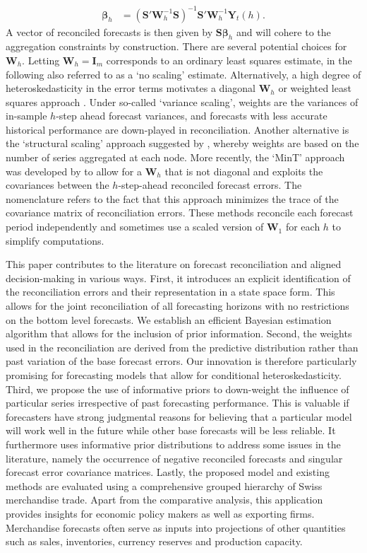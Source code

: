 \documentclass[a4paper,fleqn,11pt]{article}
\begin{document}
\begin{align}
\label{eq:reg}
\boldsymbol{\beta}_{h} &= \left(\textbf{S}'\textbf{W}_h^{-1}\textbf{S} \right)^{-1} \textbf{S}'\textbf{W}_h^{-1}\textbf{Y}_t(h).
\end{align}
A vector of reconciled forecasts is then given by $\textbf{S} \boldsymbol{\beta}_{h}$ and will cohere to the aggregation constraints by construction. There are several potential choices for $\textbf{W}_h$. Letting $\textbf{W}_h = \textbf{I}_m$ corresponds to an ordinary least squares estimate, in the following also referred to as a `no scaling' estimate. Alternatively, a high degree of heteroskedasticity in the error terms motivates a diagonal $\textbf{W}_h$ or weighted least squares approach \citep{Hyndman2016}. Under so-called `variance scaling', weights are the variances of in-sample $h$-step ahead forecast variances, and forecasts with less accurate historical performance are down-played in reconciliation. Another alternative is the `structural scaling' approach suggested by \cite{Athanasopoulos2017}, whereby weights are based on the number of series aggregated at each node. More recently, the `MinT' approach was developed by \cite{Wickramasuriya2015} to allow for a $\textbf{W}_h$ that is not diagonal and exploits the covariances between the $h$-step-ahead reconciled forecast errors. The nomenclature refers to the fact that this approach minimizes the trace of the covariance matrix of reconciliation errors. These methods reconcile each forecast period independently and sometimes use a scaled version of $\textbf{W}_1$ for each $h$ to simplify computations.

This paper contributes to the literature on forecast reconciliation and aligned decision-making in various ways. First, it introduces an explicit identification of the reconciliation errors and their representation in a state space form. This allows for the joint reconciliation of all forecasting horizons with no restrictions on the bottom level forecasts. We establish an efficient Bayesian estimation algorithm that allows for the inclusion of prior information. Second, the weights used in the reconciliation are derived from the predictive distribution rather than past variation of the base forecast errors. Our innovation is therefore particularly promising for forecasting models that allow for conditional heteroskedasticity. Third, we propose the use of informative priors to down-weight the influence of particular series irrespective of past forecasting performance. This is valuable if forecasters have strong judgmental reasons for believing that a particular model will work well in the future while other base forecasts will be less reliable. It furthermore uses informative prior distributions to address some issues in the literature, namely the occurrence of negative reconciled forecasts and singular forecast error covariance matrices. Lastly, the proposed model and existing methods are evaluated using a comprehensive grouped hierarchy of Swiss merchandise trade. Apart from the comparative analysis, this application provides insights for economic policy makers as well as exporting firms. Merchandise forecasts often serve as inputs into projections of other quantities such as sales, inventories, currency reserves and production capacity.
\end{document}
